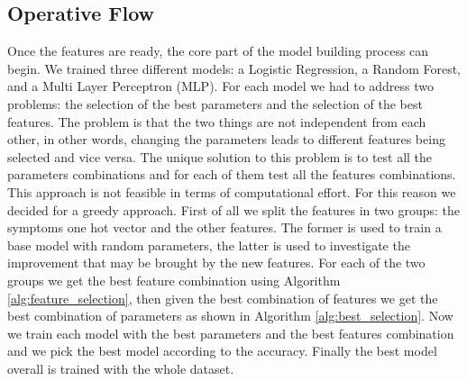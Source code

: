 
\subsection{Operative Flow}

Once the features are ready, the core part of the model building process can begin.
We trained three different models: a Logistic Regression, a Random Forest, and a Multi Layer Perceptron (MLP).
For each model we had to address two problems: the selection of the best parameters and the selection of the best features.
The problem is that the two things are not independent from each other, in other words, changing the parameters 
leads to different features being selected and vice versa. The unique solution to this problem is to test all the parameters 
combinations and for each of them test all the features combinations. This approach is not feasible
in terms of computational effort. 
For this reason we decided for a greedy approach. First of all we split the features in two groups: the symptoms one hot vector
and the other features. The former is used to train a base model with random parameters, the latter is used to investigate
the improvement that may be brought by the new features. For each of the two groups
we get the best feature combination using Algorithm \ref{alg:feature_selection}, then given the best combination of features
we get the best combination of parameters as shown in Algorithm \ref{alg:best_selection}. Now we train each model with the best parameters
and the best features combination and we pick the best model according to the accuracy. Finally the best model overall is trained
with the whole dataset.

